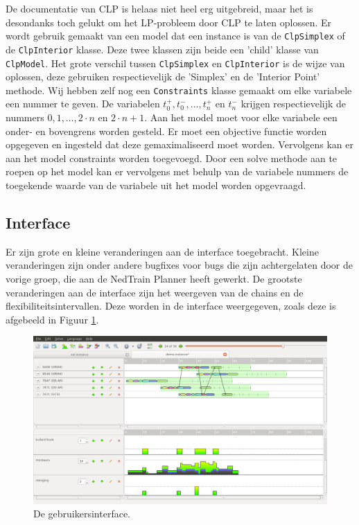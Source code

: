 De documentatie van CLP is helaas niet heel erg uitgebreid, maar het is desondanks toch gelukt om het LP-probleem door CLP te laten oplossen. Er wordt gebruik gemaakt van een model dat een instance is van de \texttt{ClpSimplex} of de \texttt{ClpInterior} klasse. Deze twee klassen zijn beide een 'child' klasse van \texttt{ClpModel}. Het grote verschil tussen \texttt{ClpSimplex} en \texttt{ClpInterior} is de wijze van oplossen, deze gebruiken respectievelijk de 'Simplex' en de 'Interior Point' methode. Wij hebben zelf nog een \texttt{Constraints} klasse gemaakt om elke variabele een nummer te geven. De variabelen $t^+_0, t^-_0, \ldots, t^+_n$ en $t^-_n$ krijgen respectievelijk de nummers $0, 1, \ldots, 2 \cdot n$ en $2 \cdot n + 1$. Aan het model moet voor elke variabele een onder- en bovengrens worden gesteld. Er moet een objective functie worden opgegeven en ingesteld dat deze gemaximaliseerd moet worden. Vervolgens kan er aan het model constraints worden toegevoegd. Door een solve methode aan te roepen op het model kan er vervolgens met behulp van de variabele nummers de toegekende waarde van de variabele uit het model worden opgevraagd. 

\subsection{Interface}
Er zijn grote en kleine veranderingen aan de interface toegebracht. Kleine veranderingen zijn onder andere bugfixes voor bugs die zijn achtergelaten door de vorige groep, die aan de NedTrain Planner heeft gewerkt. De grootste veranderingen aan de interface zijn het weergeven van de chains en de flexibiliteitsintervallen. Deze worden in de interface weergegeven, zoals deze is afgebeeld in Figuur \ref{fig:GUIfinal}.

\begin{figure}[H]
\centering
\includegraphics[width=.95\textwidth]{../images/GUIfinal.png}
\caption{De gebruikersinterface.}
\label{fig:GUIfinal}
\end{figure}

